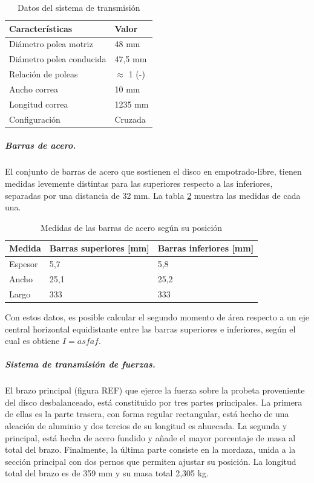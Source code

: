 \begin{table}[h]
\centering
\begin{tabular}{@{}ll@{}}
\toprule
Características          & Valor   			\\ \midrule
Diámetro polea motriz    & 48 mm   			\\
Diámetro polea conducida & 47,5 mm 			\\
Relación de poleas		 & $\approx$ 1 (-) 	\\
Ancho correa             & 10 mm   			\\
Longitud correa          & 1235 mm 			\\
Configuración            & Cruzada 			\\ \bottomrule
\end{tabular}
\caption{Datos del sistema de transmisión}
\label{tab:sist_transmision}
\end{table}

\subparagraph{Barras de acero.}
El conjunto de barras de acero que sostienen el disco en empotrado-libre, tienen medidas levemente distintas para las superiores respecto a las inferiores, separadas por una distancia de 32 mm. La tabla \ref{tab:medidas_barrasacero} muestra las medidas de cada una.
\begin{table}[h]
\centering
\begin{tabular}{@{}lll@{}}
\toprule
Medida  & Barras superiores {[}mm{]} & Barras inferiores {[}mm{]} \\ \midrule
Espesor      & 5,7                        & 5,8                        \\
Ancho        & 25,1                       & 25,2                       \\
Largo        & 333                        & 333                        \\ \bottomrule
\end{tabular}
\caption{Medidas de las barras de acero según su posición}
\label{tab:medidas_barrasacero}
\end{table}

Con estos datos, es posible calcular el segundo momento de área respecto a un eje central horizontal equidistante entre las barras superiores e inferiores, según el cual es obtiene $I=asfaf$. 

\subparagraph{Sistema de transmisión de fuerzas.}
El brazo principal (figura REF) que ejerce la fuerza sobre la probeta proveniente del disco desbalanceado, está constituido por tres partes principales. La primera de ellas es la parte trasera, con forma regular rectangular, está hecho de una aleación de aluminio y dos tercios de su longitud es ahuecada. La segunda y principal, está hecha de acero fundido y añade el mayor porcentaje de masa al total del brazo. Finalmente, la última parte consiste en la mordaza, unida a la sección principal con dos pernos que permiten ajustar su posición. La longitud total del brazo es de 359 mm y su masa total 2,305 kg.

